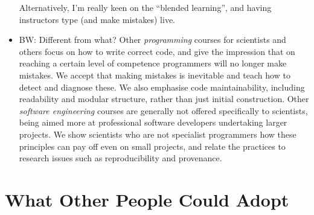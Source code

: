 \documentclass{article}
\begin{document}
\begin{itemize}
Alternatively, I'm really keen on the ``blended learning'', and having instructors type (and make mistakes) live.

  \item BW: Different from what? Other {\em programming} courses for
    scientists and others focus on how to write correct code,
    and give the impression that on reaching a certain level of competence
    programmers will no longer make mistakes. We accept that making
    mistakes is inevitable and teach how to detect and diagnose these.
    We also emphasise code maintainability, including readability and
    modular structure, rather than just initial construction.
    Other {\em software engineering} courses are generally not offered
    specifically to scientists, being aimed more at professional
    software developers undertaking larger projects. We show scientists
    who are not specialist programmers how these principles can pay off
    even on small projects, and relate the practices to research issues such as
    reproducibility and provenance.

\end{itemize}

\section{What Other People Could Adopt}
\end{document}
